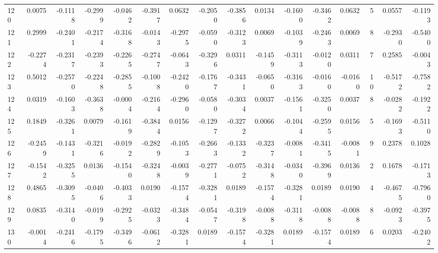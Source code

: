 \begin{tabular}{lrrrrrrrrrrrrrrr}
120 &      0.0075 & -0.1118 & -0.2999 & -0.0462 & -0.3917 &  0.0632 & -0.2050 & -0.3856 &  0.0134 & -0.1600 &  -0.3462 &     0.0632 &      5 &                    0.0557 &                    -0.1193 \\
121 &      0.2999 & -0.2401 & -0.2174 & -0.3168 & -0.0143 & -0.2975 & -0.0590 & -0.3123 &  0.0069 & -0.1039 &  -0.2463 &     0.0069 &      8 &                   -0.2930 &                    -0.5400 \\
122 &     -0.2274 & -0.2317 & -0.2393 & -0.2265 & -0.2747 & -0.0643 & -0.3296 &  0.0311 & -0.1459 & -0.3113 &  -0.0120 &     0.0311 &      7 &                    0.2585 &                    -0.0043 \\
123 &      0.5012 & -0.2570 & -0.2248 & -0.2855 & -0.1008 & -0.2420 & -0.1767 & -0.3431 & -0.0650 & -0.3163 &  -0.0160 &    -0.0160 &     10 &                   -0.5172 &                    -0.7582 \\
124 &      0.0319 & -0.1603 & -0.3638 & -0.0004 & -0.2164 & -0.2960 & -0.0580 & -0.3034 &  0.0037 & -0.1561 &  -0.3250 &     0.0037 &      8 &                   -0.0282 &                    -0.1922 \\
125 &      0.1849 & -0.3261 &  0.0079 & -0.1619 & -0.3844 &  0.0156 & -0.1297 & -0.3272 &  0.0066 & -0.1044 &  -0.2595 &     0.0156 &      5 &                   -0.1693 &                    -0.5110 \\
126 &     -0.2459 & -0.1431 & -0.3216 & -0.0192 & -0.2829 & -0.1053 & -0.2663 & -0.1332 & -0.3237 & -0.0081 &  -0.3415 &    -0.0081 &      9 &                    0.2378 &                     0.1028 \\
127 &     -0.1542 & -0.3255 &  0.0136 & -0.1540 & -0.3248 & -0.0039 & -0.2771 & -0.0752 & -0.3148 & -0.0340 &  -0.3969 &     0.0136 &      2 &                    0.1678 &                    -0.1713 \\
128 &      0.4865 & -0.3095 & -0.0406 & -0.4033 &  0.0190 & -0.1574 & -0.3281 &  0.0189 & -0.1574 & -0.3281 &   0.0189 &     0.0190 &      4 &                   -0.4675 &                    -0.7960 \\
129 &      0.0835 & -0.3140 & -0.0199 & -0.2925 & -0.0323 & -0.3484 & -0.0547 & -0.3198 & -0.0088 & -0.3118 &  -0.0088 &    -0.0088 &      8 &                   -0.0923 &                    -0.3975 \\
130 &     -0.0014 & -0.2416 & -0.1795 & -0.3496 & -0.0612 & -0.3281 &  0.0189 & -0.1574 & -0.3281 &  0.0189 &  -0.1574 &     0.0189 &      6 &                    0.0203 &                    -0.2402 \\

\end{tabular}
